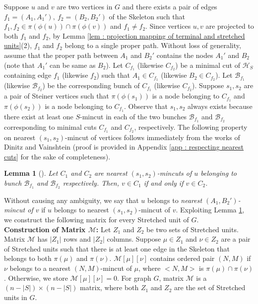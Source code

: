 \documentclass[letterpaper,11pt]{article}
\newtheorem{lemma}{Lemma}[]
\begin{document}
Suppose $u$ and $v$ are two vertices in $G$ and there exists a pair of edges $f_1=(A_1,A_1'),~f_2=(B_2,B_2')$ of the Skeleton such that $f_1,f_2\in \pi(\phi(u)) \cap \pi(\phi(v))$ and $f_1\ne f_2$. Since vertices $u,v$ are projected to both $f_1$ and $f_2$, by Lemma \ref{lem : projection mapping of terminal and stretched units}(2), $f_1$ and $f_2$ belong to a single proper path. Without loss of generality, assume that the proper path between $A_1$ and $B_2'$ contains the nodes $A_1'$ and $B_2$ (note that $A_1'$ can be same as $B_2$). Let $C_{f_1}$ (likewise $C_{f_2}$) be a minimal cut of ${\mathcal H}_S$ containing edge $f_1$ (likewise $f_2$) such that $A_1\in C_{f_1}$ (likewise $B_2\in C_{f_2}$). Let ${\mathcal B}_{f_1}$ (likewise ${\mathcal B}_{f_2}$) be the corresponding bunch of $C_{f_1}$ (likewise $C_{f_2}$). Suppose $s_1,s_2$ are a pair of Steiner vertices such that $\pi(\phi(s_1))$ is a node belonging to $C_{f_1}$ and $\pi(\phi(s_2))$ is a node belonging to $C_{f_1}$. Observe that $s_1,s_2$ always exists because there exist at least one $S$-mincut in each of the two bunches ${\mathcal B}_{f_1}$ and ${\mathcal B}_{f_2}$ corresponding to minimal cuts $C_{f_1}$ and $C_{f_2}$, respectively. The following property on nearest $(s_1,s_2)$-mincut of vertices follows immediately from the works of Dinitz and Vainshtein \cite{DBLP:conf/stoc/DinitzV94, DBLP:conf/soda/DinitzV95, DBLP:journals/siamcomp/DinitzV00} (proof is provided in Appendix \ref{app : respecting nearest cuts} for the sake of completeness). \begin{lemma}[\cite{DBLP:conf/stoc/DinitzV94, DBLP:conf/soda/DinitzV95, DBLP:journals/siamcomp/DinitzV00}] \label{lem : respecting nearest cuts}
     Let $C_1$ and $C_2$ are nearest $(s_1,s_2)$-mincuts of $u$ belonging to bunch ${\mathcal B}_{f_1}$ and ${\mathcal B}_{f_2}$ respectively. Then, $v\in C_1$ if and only if $v\in C_2$.  
\end{lemma}


Without causing any ambiguity, we say that $u$ belongs to \textit{nearest $(A_1,B_2')$-mincut of $v$} if $u$ belongs to nearest $(s_1,s_2)$-mincut of $v$. Exploiting Lemma \ref{lem : respecting nearest cuts}, we construct the following matrix for every Stretched unit of $G$.\\

\noindent
\textbf{Construction of Matrix ${\mathcal M}$:} Let $Z_1$ and $Z_2$ be two sets of Stretched units. Matrix ${\mathcal M}$ has $|Z_1|$ rows and $|Z_2|$ columns. Suppose $\mu\in Z_1$ and $\nu\in Z_2$ are a pair of Stretched units such that there is at least one edge in the Skeleton that belongs to both $\pi(\mu)$ and $\pi(\nu)$. ${\mathcal M}[\mu][\nu]$ contains ordered pair $(N,M)$ if $\nu$ belongs to a nearest $(N,M)$-mincut of $\mu$, where $<N,M>$ is $\pi(\mu)\cap \pi(\nu)$. 
Otherwise, we store ${\mathcal M}[\mu][\nu]=0$. For graph $G$, matrix ${\mathcal M}$ is a $(n-|S|)\times (n-|S|)$ matrix, where both $Z_1$ and $Z_2$ are the set of Stretched units in $G$. \\
\end{document}
